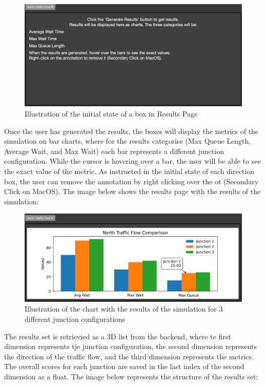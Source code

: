\documentclass{article}
\begin{document}
        \begin{figure}[H]
            \centering
            \includegraphics[width=\textwidth]{results1.png}
            \caption{Illustration of the initial state of a box in Results Page}
            \label{fig:results1}
        \end{figure}

        Once the user has generated the results, the boxes will display the metrics of the simulation on bar charts, where for the results categories (Max Queue Length, Average Wait, and Max Wait)
        each bar represents a different junction configuration. While the cursor is hovering over a bar, the user will be able to see the exact value of the metric. As instructed in the initial state 
        of each direction box, the user can remove the annotation by right clicking over the ot (Secondary Click on MacOS). The image below shows the results page with the results of the simulation:

        \begin{figure}[H]
            \centering
            \includegraphics[width=\textwidth]{results2.png}
            \caption{Illustration of the chart with the results of the simulation for 3 different junction configurations} 
            \label{fig:results2}
        \end{figure}

        The results set is retrievied as a 3D list from the backend, where te first dimension represents tje junction configuration, the second dimension represents the direction of the traffic flow, and the third dimension represents the metrics. The overall scores 
        for each junction are saved in the last index of the second dimension as a float. The image below represents the structure of the results set:
\end{document}
